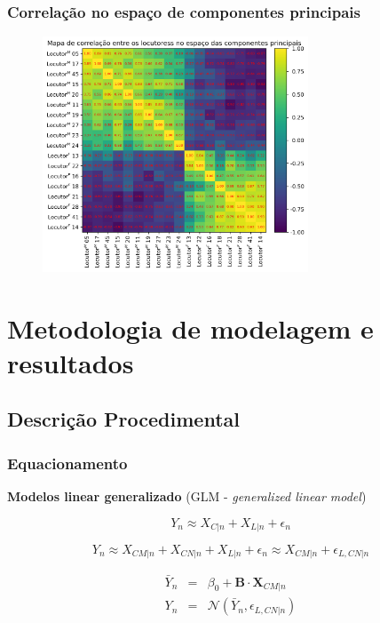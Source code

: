 \documentclass[121pt, aspectratio=169, t]{beamer}
\begin{document}
\begin{frame}[fragile=singleslide]
	\frametitle{Correlação no espaço de componentes principais}
	\begin{figure}
		\centering
		\includegraphics[height=7cm]{Correelacao_pca_loc.png}
	\end{figure}
\end{frame}
\section{Metodologia de modelagem e resultados}
\subsection{Descrição Procedimental}
\begin{frame}[fragile=singleslide]
	\frametitle{Equacionamento}
	\textbf{Modelos linear generalizado} (GLM - \textit{generalized linear model})
	
	\begin{equation}
		 Y_{n} \approx X_{C|n} + X_{L|n} + \epsilon_{n}
	\end{equation}

	\begin{equation}
		Y_{n} \approx X_{CM|n} + X_{CN|n} + X_{L|n} + \epsilon_{n} \approx X_{CM|n} + \epsilon_{L,CN|n}
	\end{equation}

	\begin{eqnarray}
		\bar{Y}_{n} &=& \beta_{0} +  \mathbf{B} \cdot \mathbf{X}_{CM|n} \nonumber \\
		Y_{n} &=& \mathcal{N} \left( \bar{Y}_{n} ,\epsilon_{L,CN|n} \right) 
	\end{eqnarray}

\end{frame}
\end{document}
